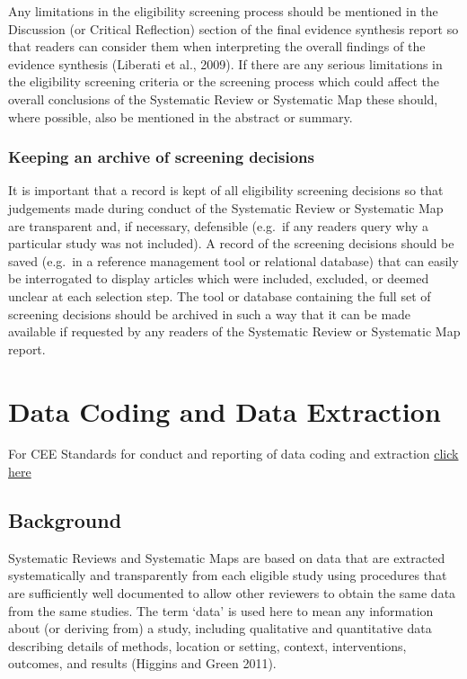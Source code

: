 \documentclass[
  letterpaper,
  DIV=11,
  numbers=noendperiod]{scrreprt}
\begin{document}
Any limitations in the eligibility screening process should be mentioned
in the Discussion (or Critical Reflection) section of the final evidence
synthesis report so that readers can consider them when interpreting the
overall findings of the evidence synthesis (Liberati et al., 2009). If
there are any serious limitations in the eligibility screening criteria
or the screening process which could affect the overall conclusions of
the Systematic Review or Systematic Map these should, where possible,
also be mentioned in the abstract or summary.

\subsection{Keeping an archive of screening
decisions}\label{keeping-an-archive-of-screening-decisions-1}

It is important that a record is kept of all eligibility screening
decisions so that judgements made during conduct of the Systematic
Review or Systematic Map are transparent and, if necessary, defensible
(e.g.~if any readers query why a particular study was not included). A
record of the screening decisions should be saved (e.g.~in a reference
management tool or relational database) that can easily be interrogated
to display articles which were included, excluded, or deemed unclear at
each selection step. The tool or database containing the full set of
screening decisions should be archived in such a way that it can be made
available if requested by any readers of the Systematic Review or
Systematic Map report.


\chapter{Data Coding and Data
Extraction}\label{data-coding-and-data-extraction}

For CEE Standards for conduct and reporting of data coding and
extraction
\href{https://environmentalevidence.org/standards-table/}{click here}

\section{Background}\label{background-1}

Systematic Reviews and Systematic Maps are based on data that are
extracted systematically and transparently from each eligible study
using procedures that are sufficiently well documented to allow other
reviewers to obtain the same data from the same studies. The term `data'
is used here to mean any information about (or deriving from) a study,
including qualitative and quantitative data describing details of
methods, location or setting, context, interventions, outcomes, and
results (Higgins and Green 2011).
\end{document}

